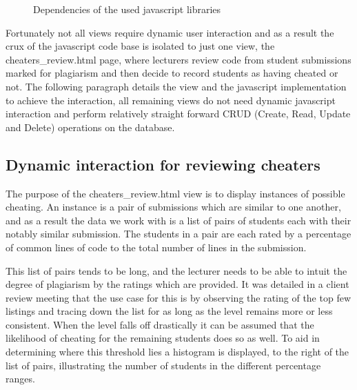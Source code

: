 \documentclass[11pt,a4paper]{article}
\begin{document}
\begin{figure}[H]
  \caption{Dependencies of the used javascript libraries}
  \label{fig:jsdependencies}
\end{figure}

Fortunately not all views require dynamic user interaction and as a result the
crux of the javascript code base is isolated to just one view, the cheaters\_review.html page, where lecturers review code from student submissions marked for plagiarism and then decide to record students as having cheated or not. The following paragraph details the view and the javascript implementation to achieve the interaction, all remaining views do not need dynamic javascript interaction and perform relatively straight forward CRUD (Create, Read, Update and Delete) operations on the database.

\subsection{Dynamic interaction for reviewing cheaters}

The purpose of the cheaters\_review.html view is to display instances of
possible cheating. An instance is a pair of submissions which are similar to one
another, and as a result the data we work with is a list of pairs of students
each with their notably similar submission. The students in a pair are each
rated by a percentage of common lines of code to the total number of lines in
the submission.

This list of pairs tends to be long, and the lecturer needs to be able to intuit the degree of plagiarism by the ratings which are provided. It was detailed in a client review meeting that the use case for this is by observing the rating of the top few listings and tracing down the list for as long as the level remains more or less consistent. When the level falls off drastically it can be assumed that the likelihood of cheating for the remaining students does so as well. To aid  in determining where this threshold lies a histogram is displayed, to the right of the list of pairs, illustrating the number of students in the different percentage ranges.
\end{document}
